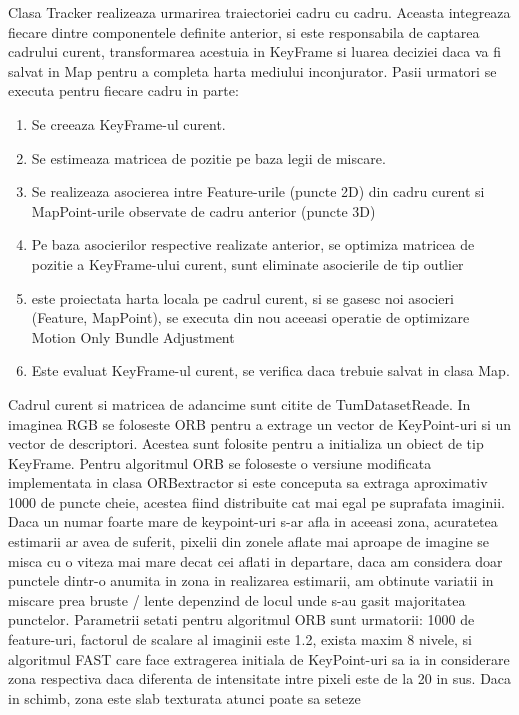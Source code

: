 \documentclass[12pt,a4paper]{report}
\begin{document}
Clasa Tracker realizeaza urmarirea traiectoriei cadru cu cadru. Aceasta integreaza 
fiecare dintre componentele definite anterior, si este responsabila de captarea cadrului curent,
transformarea acestuia in KeyFrame si luarea deciziei daca va fi salvat in Map pentru a completa 
harta mediului inconjurator. Pasii urmatori se executa pentru fiecare cadru in parte:
\begin{enumerate}
    \item Se creeaza KeyFrame-ul curent.
    \item Se estimeaza matricea de pozitie pe baza legii de miscare.
    \item Se realizeaza asocierea intre Feature-urile (puncte 2D) din cadru curent si 
MapPoint-urile observate de cadru anterior (puncte 3D)
    \item Pe baza asocierilor respective realizate anterior, se optimiza matricea de pozitie
a KeyFrame-ului curent, sunt eliminate asocierile de tip outlier
    \item este proiectata harta locala pe cadrul curent, si se gasesc noi asocieri 
(Feature, MapPoint), se executa din nou aceeasi operatie de optimizare Motion Only Bundle Adjustment
    \item Este evaluat KeyFrame-ul curent, se verifica daca trebuie salvat in clasa Map. 
\end{enumerate}
Cadrul curent si matricea de adancime sunt citite de TumDatasetReade. In imaginea RGB 
se foloseste ORB pentru a extrage un vector de KeyPoint-uri si un vector de descriptori. 
Acestea sunt folosite pentru a initializa un obiect de tip KeyFrame. Pentru algoritmul ORB se 
foloseste o versiune modificata implementata in clasa ORBextractor si este conceputa sa extraga 
aproximativ 1000 de puncte cheie, acestea fiind distribuite cat mai egal pe suprafata imaginii. 
Daca un numar foarte mare de keypoint-uri s-ar afla in aceeasi zona, acuratetea estimarii ar 
avea de suferit, pixelii din zonele aflate mai aproape de imagine se misca cu o viteza mai mare 
decat cei aflati in departare, daca am considera doar punctele dintr-o anumita in zona in realizarea
estimarii, am obtinute variatii in miscare prea bruste / lente depenzind de locul unde s-au gasit 
majoritatea punctelor.  Parametrii setati pentru algoritmul ORB sunt urmatorii: 1000 de feature-uri,
factorul de scalare al imaginii este 1.2, exista maxim 8 nivele, si algoritmul FAST care face 
extragerea initiala de KeyPoint-uri sa ia in considerare zona respectiva daca diferenta de intensitate
intre pixeli este de la 20 in sus. Daca in schimb, zona este slab texturata atunci poate sa seteze
\end{document}
